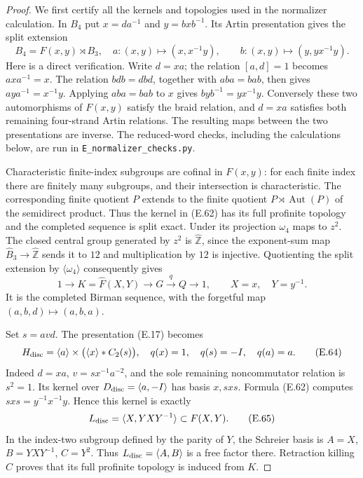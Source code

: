 \begin{proof}
We first certify all the kernels and topologies used
in the normalizer calculation.  In $B_4$ put
$x=da^{-1}$ and $y=bxb^{-1}$.  Its Artin presentation
gives the split extension
\[
 B_4=F(x,y)\rtimes B_3,
 \quad
 a:(x,y)\longmapsto(x,x^{-1}y),\qquad
 b:(x,y)\longmapsto(y,yx^{-1}y).                          \tag{E.62}
\]
Here is a direct verification.  Write $d=xa$; the
relation $[a,d]=1$ becomes $axa^{-1}=x$.
The relation $bdb=dbd$, together with $aba=bab$,
then gives $aya^{-1}=x^{-1}y$.  Applying $aba=bab$
to $x$ gives $byb^{-1}=yx^{-1}y$.  Conversely these
two automorphisms of $F(x,y)$ satisfy the braid
relation, and $d=xa$ satisfies both remaining
four-strand Artin relations.  The resulting maps
between the two presentations are inverse.
The reduced-word checks, including the calculations
below, are run in \texttt{E\_normalizer\_checks.py}.

Characteristic finite-index subgroups are cofinal
in $F(x,y)$: for each finite index there are finitely
many subgroups, and their intersection is
characteristic.  The corresponding finite quotient
$P$ extends to the finite quotient
$P\rtimes\operatorname{Aut}(P)$ of the semidirect
product.  Thus the kernel in (E.62) has its full
profinite topology and the completed sequence is
split exact.  Under its projection $\omega _4$
maps to $z^2$.  The closed central group generated
by $z^2$ is $\widehat{\mathbb Z}$, since the
exponent-sum map $\widehat B_3\to\widehat{\mathbb Z}$
sends it to $12$ and multiplication by $12$ is
injective.  Quotienting the split extension by
$\langle\omega _4\rangle$ consequently gives
\[
 1\longrightarrow K=\widehat F(X,Y)
 \longrightarrow G\overset q\longrightarrow Q
 \longrightarrow1,
 \qquad X=x,\quad Y=y^{-1}.                              \tag{E.63}
\]
It is the completed Birman sequence, with the
forgetful map $(a,b,d)\mapsto(a,b,a)$.

Set $s=avd$.  The presentation (E.17) becomes
\[
 H_{\rm disc}=\langle a\rangle\times
       \bigl(\langle x\rangle*C_2(s)\bigr),
 \quad q(x)=1,\quad q(s)=-I,\quad q(a)=a.                 \tag{E.64}
\]
Indeed $d=xa$, $v=sx^{-1}a^{-2}$, and the sole
remaining noncommutator relation is $s^2=1$.
Its kernel over $D_{\rm disc}=\langle a,-I\rangle$
has basis $x,sxs$.  Formula (E.62) computes
$sxs=y^{-1}x^{-1}y$.  Hence this kernel is exactly
\[
 L_{\rm disc}=\langle X,YXY^{-1}\rangle
                   \subset F(X,Y).                     \tag{E.65}
\]
In the index-two subgroup defined by the parity of
$Y$, the Schreier basis is
$A=X$, $B=YXY^{-1}$, $C=Y^2$.
Thus $L_{\rm disc}=\langle A,B\rangle$ is a free
factor there.  Retraction killing $C$ proves that
its full profinite topology is induced from $K$.


\end{proof}
